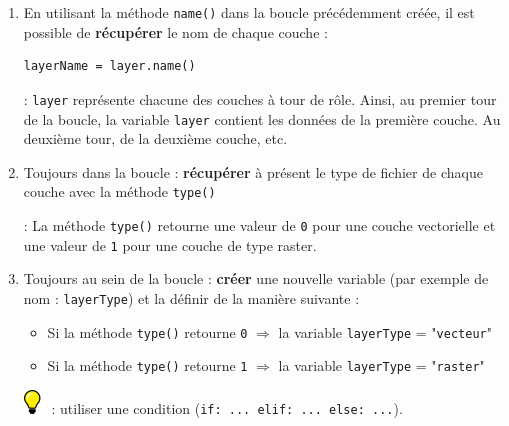 \documentclass[11pt]{article}
\begin{document}
\begin{enumerate}
\item En utilisant la méthode \og{}\texttt{name()}\fg{} dans la boucle précédemment créée, il est possible de \textbf{récupérer} le nom de chaque couche : 
\vspace*{-1.64em}
\begin{center}
\begin{minipage}[t]{0.30\textwidth}
\begin{verbatim}
layerName = layer.name()
\end{verbatim}
\end{minipage}
\end{center}
\vspace*{1em}

\underline{}: \og{}\texttt{layer}\fg{} représente chacune des couches à tour de rôle. Ainsi, au premier tour de la boucle, la variable \og{}\texttt{layer}\fg{} contient les données de la première couche. Au deuxième tour, de la deuxième couche, etc. 

\item Toujours dans la boucle : \textbf{récupérer} à présent le type de fichier de chaque couche avec la méthode \og{}\texttt{type()}\fg{}

\underline{}: La méthode \og{}\texttt{type()}\fg{} retourne une valeur de \og{}\texttt{0}\fg{} pour une couche vectorielle et une valeur de \og{}\texttt{1}\fg{} pour une couche de type raster.  


\item Toujours au sein de la boucle : \textbf{créer} une nouvelle variable (par exemple de nom : \og{}\texttt{layerType}\fg{}) et la définir de la manière suivante : 

\begin{itemize}\itemsep0.2em
\renewcommand\labelitemi{\---}
\item Si la méthode \og{}\texttt{type()}\fg{} retourne \og{}\texttt{0}\fg{} $\Rightarrow$ la variable \og{}\texttt{layerType}\fg{} = "\texttt{vecteur}" 
\item Si la méthode \og{}\texttt{type()}\fg{} retourne \og{}\texttt{1}\fg{} $\Rightarrow$ la variable \og{}\texttt{layerType}\fg{} = "\texttt{raster}" 
\end{itemize}

\includegraphics[scale=1]{tip_l.png} \underline{}: utiliser une condition (\texttt{if: ... elif: ... else: ...}). 


\end{enumerate}
\end{document}
